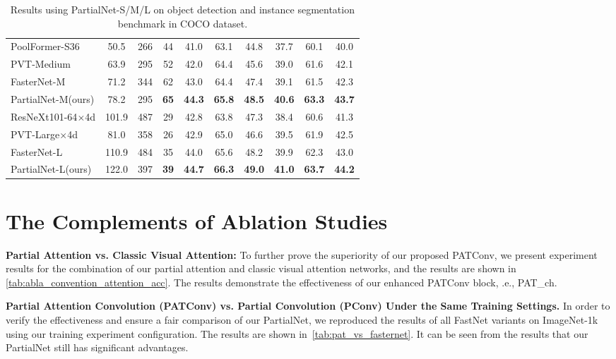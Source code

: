 \begin{table*}[ht]
{\begin{tabular}{@{}lccccc cccc@{}}
    PoolFormer-S36\cite{Yu2022a}          & 50.5    & 266   &44          & 41.0       & 63.1       & 44.8       & 37.7       & 60.1       & 40.0       \\
    PVT-Medium\cite{Wang2021c}            & 63.9    & 295   &52          & 42.0       & 64.4       & 45.6       & 39.0       & 61.6       & 42.1       \\
    FasterNet-M\cite{Chen2023}            & 71.2    & 344   &62          & 43.0       & 64.4       & 47.4       & 39.1       & 61.5       & 42.3       \\
    PartialNet-M(ours)                    & 78.2    & 295   &{\bf 65}    & {\bf 44.3} & {\bf 65.8} & {\bf 48.5} & {\bf 40.6} & {\bf 63.3} & {\bf 43.7} \\
    \hline
    ResNeXt101-64$\times$4d\cite{Xie2017} & 101.9   & 487   &29          & 42.8       & 63.8       & 47.3       & 38.4       & 60.6       & 41.3       \\
    PVT-Large$\times$4d\cite{Wang2021c}   & 81.0    & 358   &26          & 42.9       & 65.0       & 46.6       & 39.5       & 61.9       & 42.5       \\
    FasterNet-L\cite{Chen2023}            & 110.9   & 484   &35          & 44.0       & 65.6       & 48.2       & 39.9       & 62.3       & 43.0       \\
    PartialNet-L(ours)                    & 122.0   & 397   &{\bf 39}    & {\bf 44.7} & {\bf 66.3} & {\bf 49.0} & {\bf 41.0} & {\bf 63.7} & {\bf 44.2} \\
    \bottomrule
  \end{tabular}
  }
  \caption{Results using PartialNet-S/M/L on object detection and instance segmentation benchmark in COCO dataset.}
  \label{tab:appendix_dect_and_seg_Benchmark}
\end{table*}

\section{The Complements of Ablation Studies}
\textbf{ Partial Attention vs. Classic Visual Attention:}
To further prove the superiority of our proposed PATConv, we present experiment results for the combination of our partial attention and classic visual attention networks, and the results are shown in \cref{tab:abla_convention_attention_acc}. The results demonstrate the effectiveness of our enhanced PATConv block, .e., PAT\_ch.

\textbf{Partial Attention Convolution (PATConv) vs. Partial Convolution (PConv) Under the Same Training Settings.}
In order to verify the effectiveness and ensure a fair comparison of our PartialNet, we reproduced the results of all FastNet variants on ImageNet-1k using our training experiment configuration. The results are shown in~\cref{tab:pat_vs_fasternet}. It can be seen from the results that our PartialNet still has significant advantages.

